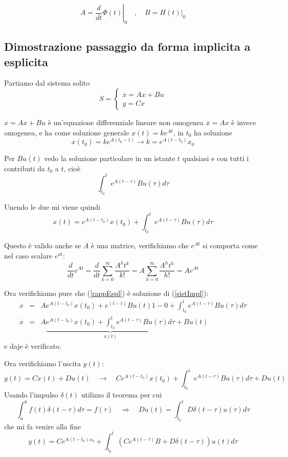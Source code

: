 \documentclass{article}
\begin{document}
\[ A = \left.\frac{d}{dt}\Phi(t)\right|_{0} \quad,\quad B = \left.H(t)\right|_{0} \]


\subsection{Dimostrazione passaggio da forma implicita a esplicita}

Partiamo dal sistema solito 
\begin{equation}\label{sistImpl}
    S = \begin{cases} \overset{\cdot}{x} = Ax+Bu\\ y = Cx \end{cases}
\end{equation}

$\overset{\cdot}{x} = Ax+Bu$ è un'equazione differenziale lineare non omogenea
$\overset{\cdot}{x} = Ax$ è invece omogenea, e ha come soluzione generale $x(t) = ke^{At}$,
in $t_0$ ha soluzione 
\[ x(t_0) = ke^{A(t_0-t)} \to k = e^{A(t-t_0)}x_0 \]

Per $Bu(t)$ vedo la soluzione particolare in un istante $t$ qualsiasi e con tutti i contributi da $t_0$ a $t$, cioè
\[ \int_{t_0}^{t}e^{A(t-\tau)}Bu(\tau)d\tau \]

Unendo le due mi viene quindi 
\begin{equation}\label{rappEspl}
    x(t) = e^{A(t-t_0)}x(t_0)+\int_{t_0}^{t}e^{A(t-\tau)}Bu(\tau)d\tau
\end{equation}

Questo è valido anche se $A$ è una matrice, verifichiamo che $e^{At}$ si comporta come nel caso
scalare $e^{at}$:
\[
\frac{d}{dt}e^{At} =     \frac{d}{dt}\sum_{k=0}^{\infty}\frac{A^kt^k}{k!} =
 A\sum_{h=0}^{\infty}\frac{A^ht^h}{h!} = Ae^{At}
\]

Ora verifichiamo pure che (\ref{rappEspl}) è soluzione di  (\ref{sistImpl}): 
\begin{align*}
    \overset{\cdot}{x} &=& Ae^{A(t-t_0)}x(t_0)+e^{(t-t)}B u(t) 1 - 0 + \int_{t_0}^{t}e^{A(t-\tau)}Bu(\tau)d\tau\\
    \overset{\cdot}{x} &=& A\underbrace{e^{A(t-t_0)}x(t_0)+ \int_{t_0}^{t}e^{A(t-\tau)}Bu(\tau)d\tau}_{x(t)}+Bu(t)
\end{align*}
e daje è verificato.


Ora verifichiamo l'uscita $y(t)$:
\[
y(t) =Cx(t)+Du(t) \quad \to\quad Ce^{A(t-t_0)}x(t_0)+    \int_{t_0}^{t}e^{A(t-\tau)}Bu(\tau)d\tau+Du(t)
\]
Usando l'impulso $\delta(t)$ utilizzo il teorema per cui
\[
\int_{a}^{b}f(t)\delta(t-\tau)d\tau = f(\tau) \quad\Longrightarrow\quad
Du(t) =   \int_{t_0}^{t} D\delta(t-\tau)u(\tau)d\tau
\]
che mi fa venire alla fine 
\[
    y(t) = Ce^{A(t-t_0)x_0}+\int_{t_0}^{t} \left(Ce^{A(t-\tau)}B+D\delta(t-\tau)\right)u(t)d\tau
\]
\end{document}
